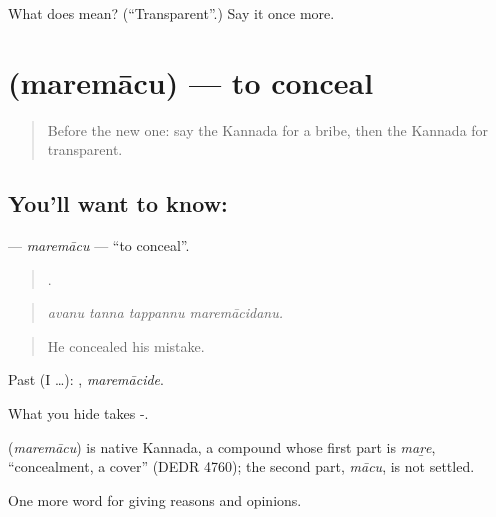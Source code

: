 \begin{tcolorbox}[breakable,colback=teal!4,colframe=teal!35!black,title={Before you move on}]
What does  mean? (\textquotedblleft{}Transparent\textquotedblright{}.) Say it once more.
\end{tcolorbox}
\section[\texorpdfstring{\kn{ಮರೆಮಾಚು} (maremācu)}{ಮರೆಮಾಚು (maremācu)}]{ (maremācu) — to conceal}

\label{lesson:KA-C402-maremacu}



\begin{quote}
Before the new one: say the Kannada for a bribe, then the Kannada for transparent.
\end{quote}

\subsection*{You'll want to know: }
\textbf{} — \emph{maremācu} — \textquotedblleft{}to conceal\textquotedblright{}.

\begin{quote}
   .
\end{quote}

\begin{quote}
\emph{avanu tanna tappannu maremācidanu.}
\end{quote}

\begin{quote}
He concealed his mistake.
\end{quote}

Past (I …): , \emph{maremācide}.

What you hide takes -.

\begin{cousinweb}
\textbf{} (\emph{maremācu}) is native Kannada, a compound whose first part is \emph{maṟe}, \textquotedblleft{}concealment, a cover\textquotedblright{} (DEDR 4760); the second part, \emph{mācu}, is not settled.
\end{cousinweb}

\begin{grammarlens}[title={What you've built}]
One more word for giving reasons and opinions.
\end{grammarlens}

